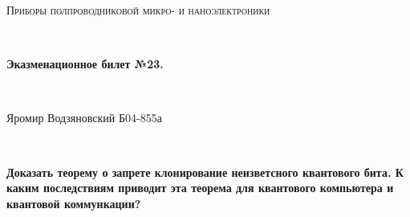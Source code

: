 \documentclass[a4paper]{article}
\begin{document}
\graphicspath{ {pictures/} }
\begin{center}
    {\scshape\Large Приборы полпроводниковой микро- и наноэлектроники} \par

    \

    {\huge\bfseries Эказменационное билет №23.} \par 

    \

    {\large Яромир Водзяновский Б04-855а}
\end{center}

\

\textbf{Доказать теорему о запрете клонирование неизветсного квантового бита. К каким последствиям приводит эта теорема для квантового компьютера и квантовой коммункации?}
\par 
\end{document}
